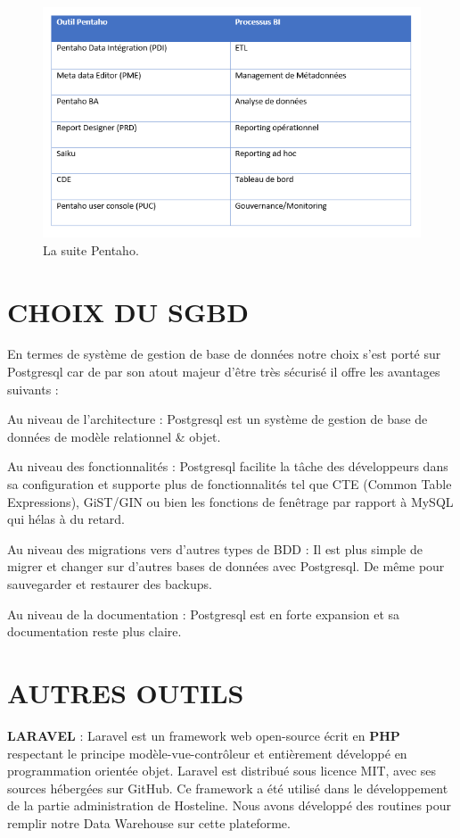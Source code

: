 \begin{figure}[!htbp]
	\begin{center}
		\includegraphics[scale=0.95]{images/tab_pentaho_tools.png}
		\caption{La suite Pentaho.}
		\label{use_bi_tools}
	\end{center}
\end{figure}


\section{CHOIX DU SGBD}

En termes de système de gestion de base de données notre choix s’est porté sur Postgresql car de par son atout majeur d’être très sécurisé il offre les avantages suivants :  
\begin{list}{•}{ }
   \item Au niveau de l’architecture : Postgresql est un système de gestion de base de données de modèle relationnel \& objet.
   \item Au niveau des fonctionnalités : Postgresql facilite la tâche des développeurs dans sa configuration et supporte plus de fonctionnalités tel que CTE (Common Table Expressions), GiST/GIN ou bien les fonctions de fenêtrage par rapport à MySQL qui hélas à du retard.
   \item Au niveau des migrations vers d’autres types de BDD : Il est plus simple de migrer et changer sur d’autres bases de données avec Postgresql. De même pour sauvegarder et restaurer des backups.
 \item Au niveau de la documentation : Postgresql est en forte expansion et sa documentation reste plus claire.
\end{list}

\section{AUTRES OUTILS}
\textbf{LARAVEL }: Laravel est un framework web open-source écrit en \textbf{PHP} respectant le principe modèle-vue-contrôleur et entièrement développé en programmation orientée objet. Laravel est distribué sous licence MIT, avec ses sources hébergées sur GitHub. Ce framework a été utilisé dans le développement de la partie administration de Hosteline. Nous avons développé des routines pour remplir notre Data Warehouse sur cette plateforme.\\

